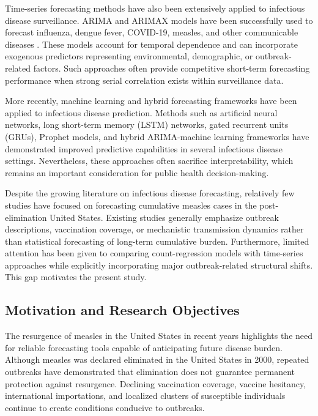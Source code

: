 \documentclass[utf8]{FrontiersinHarvard} %
\begin{document}
Time-series forecasting methods have also been extensively applied to infectious disease surveillance. ARIMA and ARIMAX models have been successfully used to forecast influenza, dengue fever, COVID-19, measles, and other communicable diseases \cite{box2015,hyndman2008,hyndman2021,chukwu2026forecasting}. These models account for temporal dependence and can incorporate exogenous predictors representing environmental, demographic, or outbreak-related factors. Such approaches often provide competitive short-term forecasting performance when strong serial correlation exists within surveillance data.



More recently, machine learning and hybrid forecasting frameworks have been applied to infectious disease prediction. Methods such as artificial neural networks, long short-term memory (LSTM) networks, gated recurrent units (GRUs), Prophet models, and hybrid ARIMA-machine learning frameworks have demonstrated improved predictive capabilities in several infectious disease settings. Nevertheless, these approaches often sacrifice interpretability, which remains an important consideration for public health decision-making.



Despite the growing literature on infectious disease forecasting, relatively few studies have focused on forecasting cumulative measles cases in the post-elimination United States. Existing studies generally emphasize outbreak descriptions, vaccination coverage, or mechanistic transmission dynamics rather than statistical forecasting of long-term cumulative burden. Furthermore, limited attention has been given to comparing count-regression models with time-series approaches while explicitly incorporating major outbreak-related structural shifts. This gap motivates the present study.

\subsection{Motivation and Research Objectives}
The resurgence of measles in the United States in recent years highlights the need for reliable forecasting tools capable of anticipating future disease burden. Although measles was declared eliminated in the United States in 2000, repeated outbreaks have demonstrated that elimination does not guarantee permanent protection against resurgence. Declining vaccination coverage, vaccine hesitancy, international importations, and localized clusters of susceptible individuals continue to create conditions conducive to outbreaks.
\end{document}
